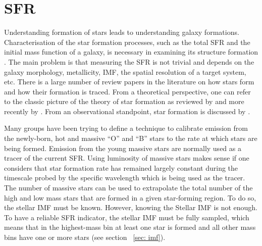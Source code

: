
\section{SFR}
\label{sec: sfr_intro}
Understanding formation of stars leads to understanding galaxy formations. Characterisation of the star formation processes, such as the total SFR and the initial mass function of a galaxy, is necessary in examining its structure formation \citep{McKee07}. The main problem is that measuring the SFR is not trivial and depends on the galaxy morphology, metallicity, IMF, the spatial resolution of a target system, etc. There is a large number of review papers in the literature on how stars form and how their formation is traced. From a theoretical perspective, one can refer to the classic picture of the theory of star formation as reviewed by \cite{Shu87} and more recently by \citep{McKee07}. From an observational standpoint, star formation is discussed by \cite{Kennicutt98b, Kewley02, Bell03, Calzetti07, Calzetti08, Calzetti10, Calzetti13, Kennicutt07, Kennicutt09, Boquien10, Hao11, Kennicutt12}.

Many groups have been trying to define a technique to calibrate emission from the newly-born, hot and massive ``O'' and ``B'' stars to the rate at which stars are being formed. Emission from the young massive stars are normally used as a tracer of the current SFR. Using luminosity of massive stars makes sense if one considers that star formation rate has remained largely constant during the timescale probed by the specific wavelength which is being used as the tracer. The number of massive stars can be used to extrapolate the total number of the high and low mass stars that are formed in a given star-forming region. To do so, the stellar IMF must be known. However, knowing the Stellar IMF is not enough. To have a reliable SFR indicator, the stellar IMF must be fully sampled, which means that in the highest-mass bin at least one star is formed and all other mass bins have one or more stars (see section ~\ref{sec: imf}).

